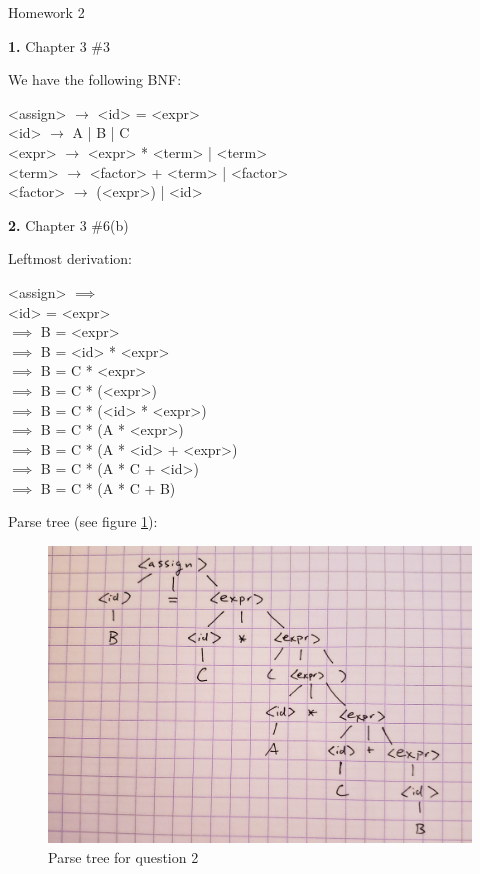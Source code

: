 \documentclass[letterpaper, 11pt]{article}
\newcommand{\hwnumbersec}[2]{\medskip \noindent\textbf{#1.} Chapter 3 \##2 \smallskip}
\newcommand{\To}{$\rightarrow$ }
\begin{document}
\begin{center}
	{\LARGE Homework 2}\\
\end{center}

\hwnumbersec{1}{3}

We have the following BNF:
\medskip

\begin{minipage}{0.8\textwidth}
\centering
\begin{grammar}
	<assign> $\rightarrow$ <id> = <expr> \\
	<id> \To A | B | C \\
	<expr> \To <expr> * <term> | <term> \\
	<term> \To <factor> + <term> | <factor> \\ 
	<factor> \To (<expr>) | <id>
\end{grammar}
\end{minipage}

\newpage
\hwnumbersec{2}{6(b)}

Leftmost derivation:
\medskip

\begin{minipage}{0.8\textwidth}
\centering
\begin{grammar}
	<assign> $\implies$\\
	<id> = <expr> \\
	$\implies$ B = <expr> \\
	$\implies$ B = <id> * <expr> \\
	$\implies$ B = C * <expr> \\
	$\implies$ B = C * (<expr>)\\
	$\implies$ B = C * (<id> * <expr>) \\
	$\implies$ B = C * (A * <expr>)\\
	$\implies$ B = C * (A * <id> + <expr>)\\
	$\implies$ B = C * (A * C + <id>)\\
	$\implies$ B = C * (A * C + B)
\end{grammar}
\end{minipage}

Parse tree (see figure \ref{fig:tree2}):

\begin{figure}[h]
\includegraphics[width=\textwidth]{hw02tree2.jpg}
\caption{Parse tree for question 2}
\label{fig:tree2}
\end{figure}
\end{document}
